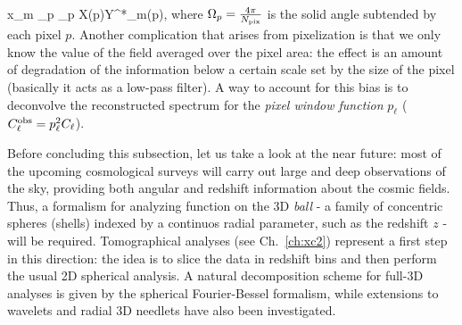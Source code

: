 %
\be
x_{\ell m} \approx \Omega_p \sum_p X(p)Y^*_{\ell m}(p),
\ee
%
where $\Omega_p = \frac{4\pi}{N_{\rm{pix}}}$ is the solid angle subtended by each pixel $p$. Another complication that arises from pixelization is that we only know the value of the field averaged over the pixel area: the effect is an amount of degradation of the information below a certain scale set by the size of the pixel (basically it acts as a low-pass filter). A way to account for this bias is to deconvolve the reconstructed spectrum for the \emph{pixel window function} $p_{\ell}$ ($C_{\ell}^{\rm{obs}} = p^2_{\ell}C_{\ell}$).

Before concluding this subsection, let us take a look at the near future: most of the upcoming cosmological surveys will carry out large and deep observations of the sky, providing both angular and redshift information about the cosmic fields. Thus, a formalism  
for analyzing function on the 3D \emph{ball} -  a family of concentric spheres (shells) indexed by a continuos radial parameter, such as the redshift $z$ - will be required. Tomographical analyses (see Ch.~\eqref{ch:xc2}) represent a first step in this direction: the idea is to slice the data in redshift bins and then perform the usual 2D spherical analysis. A natural decomposition scheme for full-3D analyses is given by the spherical Fourier-Bessel formalism, while extensions to wavelets \citep{Lanusse2012,Leistedt2012} and radial 3D needlets \citep{Durastanti2014} have also been investigated.

